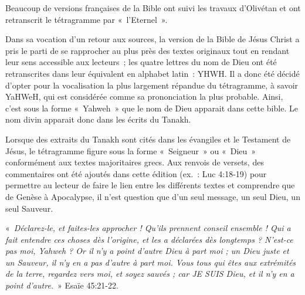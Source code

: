 \begin{small}
Beaucoup de versions françaises de la Bible ont suivi les travaux d'Olivétan et ont retranscrit le tétragramme par « l'Eternel ».\bigskip

Dans sa vocation d'un retour aux sources, la version de la Bible de Jésus Christ a pris le parti de se rapprocher au plus près des textes originaux tout en rendant leur sens accessible aux lecteurs ; les quatre lettres du nom de Dieu ont été retranscrites dans leur équivalent en alphabet latin : YHWH. Il a donc été décidé d'opter pour la vocalisation la plus largement répandue du tétragramme, à savoir YaHWeH, qui est considérée comme sa prononciation la plus probable. Ainsi, c'est sous la forme « Yahweh » que le nom de Dieu apparait dans cette bible. Le nom divin apparait donc dans les écrits du Tanakh.\bigskip

Lorsque des extraits du Tanakh sont cités dans les évangiles et le Testament de Jésus, le tétragramme figure sous la forme « Seigneur » ou « Dieu » conformément aux textes majoritaires grecs. Aux renvois de versets, des commentaires ont été ajoutés dans cette édition (ex. : Luc 4:18-19) pour permettre au lecteur de faire le lien entre les différents textes et comprendre que de Genèse à Apocalypse, il n'est question que d'un seul message, un seul Dieu, un seul Sauveur.\bigskip

« \emph{Déclarez-le, et faites-les approcher ! Qu'ils prennent conseil ensemble ! Qui a fait entendre ces choses dès l'origine, et les a déclarées dès longtemps ? N'est-ce pas moi, Yahweh ? Or il n'y a point d'autre Dieu à part moi ; un Dieu juste et un Sauveur, il n'y en a pas d'autre à part moi. Vous tous qui êtes aux extrémités de la terre, regardez vers moi, et soyez sauvés ; car JE SUIS Dieu, et il n'y en a point d'autre.} » Esaïe 45:21-22.
\end{small}
